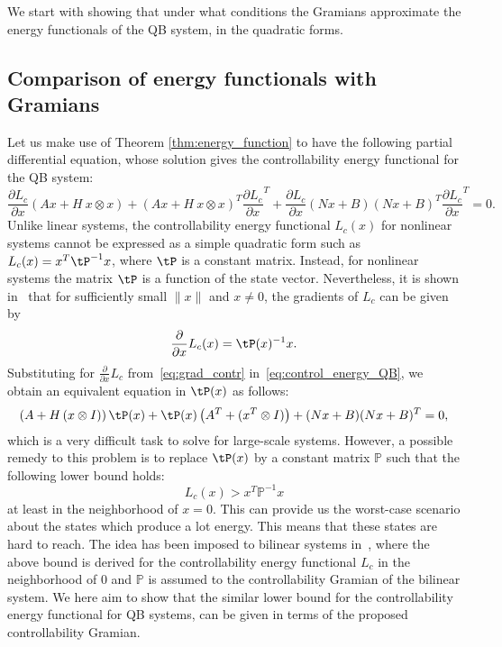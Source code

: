 We start with showing  that under what conditions the Gramians approximate the energy functionals of the QB system, in the quadratic forms.
\subsection{Comparison of energy functionals with  Gramians}\label{subsec:energy}
Let us make use of Theorem \ref{thm:energy_function} to have the following partial differential equation, whose solution gives the controllability energy functional for the QB system:
\begin{equation}\label{eq:control_energy_QB}
 \dfrac{\partial L_c}{\partial x}(Ax + H~x\otimes x) +  (Ax + H~x\otimes x)^T\dfrac{\partial L_c}{\partial x}^T + \dfrac{\partial L_c}{\partial x}(N x + B)(N x + B)^T \dfrac{\partial L_c}{\partial x} ^T = 0.
\end{equation}
Unlike linear systems, the controllability energy functional $L_c(x)$ for nonlinear systems cannot be expressed as a simple quadratic form such as $L_c(x) = x^T\tP^{-1}x$, where $\tP$ is a constant matrix. Instead, for nonlinear systems the matrix $\tP$ is  a function of the state vector. Nevertheless, it is shown in~\cite{enefungray98} that for sufficiently small  $\|x\|$  and $x\neq 0$, the gradients of $L_c$ can be given by
\begin{equation}\label{eq:grad_contr}
 \dfrac{\partial}{\partial x}L_c(x) = \tP(x)^{-1}x.
\end{equation}
Substituting for $\tfrac{\partial}{\partial x}L_c$ from~\eqref{eq:grad_contr} in~\eqref{eq:control_energy_QB}, we obtain an equivalent equation in $\tP(x)$ as follows:
\begin{equation*}
 \left(A+H\left(x\otimes I\right)\right)\tP(x) + \tP(x)\left(A^T + (x^T\otimes I)\right) + (Nx + B)(Nx + B)^T = 0,
\end{equation*}
which is a very difficult task to solve for large-scale systems. However, a possible remedy to this problem  is to replace $\tP(x)$ by a constant matrix $\mathbb P$ such that the following lower bound holds:
\begin{equation}
 L_c(x) > x^T\mathbb P^{-1}x
\end{equation}
at least in the neighborhood of $x = 0$. This can provide us the worst-case scenario about the states which produce a lot energy. This means that these states are hard to reach.
The idea has been imposed to bilinear systems in~\cite{enefungray98}, where the above bound is derived for the controllability energy functional $L_c$ in the neighborhood of $0$ and $\mathbb P$ is assumed to the controllability Gramian of the bilinear system. We here aim to show that the similar lower bound for the controllability energy functional for QB systems, can be given in terms of the proposed controllability Gramian.
